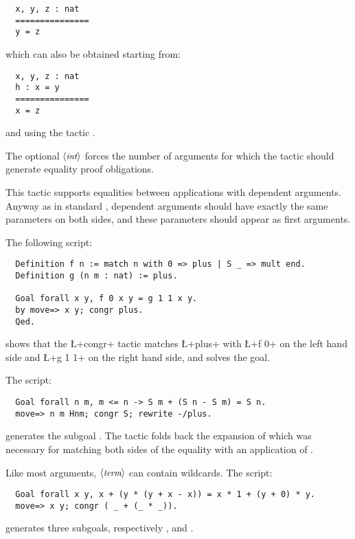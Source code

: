 \begin{lstlisting}
  x, y, z : nat
  ===============
  y = z
\end{lstlisting}
which can also be obtained starting from:
\begin{lstlisting}
  x, y, z : nat
  h : x = y
  ===============
  x = z
\end{lstlisting}
and using the tactic .

The optional $\langle\mbox{\itshape\rmfamily\small int}\rangle$ forces the number of arguments for which the
tactic should generate equality proof obligations.

This tactic supports equalities between applications with dependent
arguments. Anyway as in standard
\Coq{}, dependent arguments should have exactly the same
parameters on both sides, and these parameters should appear as first
arguments.

The following script:
\begin{lstlisting}
  Definition f n := match n with 0 => plus | S _ => mult end.
  Definition g (n m : nat) := plus.

  Goal forall x y, f 0 x y = g 1 1 x y.
  by move=> x y; congr plus.
  Qed.
\end{lstlisting}
shows that the \L+congr+ tactic matches \L+plus+ with \L+f 0+ on the
left hand side and \L+g 1 1+ on the right hand side, and solves the goal.

The script:
\begin{lstlisting}
  Goal forall n m, m <= n -> S m + (S n - S m) = S n.
  move=> n m Hnm; congr S; rewrite -/plus.
\end{lstlisting}
generates the subgoal . The tactic
 folds back the expansion of  which was
necessary for matching both sides of the equality with an application
of .

Like most \ssr{} arguments, $\langle\mbox{\itshape\rmfamily\small term}\rangle$ can contain wildcards.
The script:
\begin{lstlisting}
  Goal forall x y, x + (y * (y + x - x)) = x * 1 + (y + 0) * y.
  move=> x y; congr ( _ + (_ * _)).
\end{lstlisting}
generates three subgoals, respectively , 
and .
